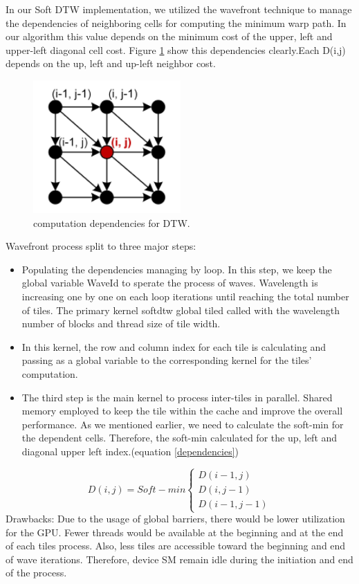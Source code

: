 \documentclass[12pt, letterpaper]{article}
\begin{document}
In our Soft DTW implementation, we utilized the wavefront technique to manage
the dependencies of neighboring cells for computing the minimum warp path. In
our algorithm this value depends on the minimum cost of the upper, left and
upper-left diagonal cell cost. Figure \ref{DTW_dependency} show this
dependencies clearly.Each D(i,j) depends on the up, left and up-left neighbor
cost.

\begin{figure}[htbp]
\includegraphics[height=2in]{img/tiling_dependencies.png}
\centering
\caption{computation dependencies for DTW.}
\label{DTW_dependency}
\end{figure}

Wavefront process split to three major steps:

\begin{itemize}
  \item Populating the dependencies managing by loop. In this step, we keep the
    global variable WaveId to sperate the process of waves. Wavelength is
    increasing one by one on each loop iterations until reaching the total
    number of tiles. The primary kernel softdtw global tiled called with the
    wavelength number of blocks and thread size of tile width.
  \item In this kernel, the row and column index for each tile is calculating
    and passing as a global variable to the corresponding kernel for the tiles’
    computation.
  \item The third step is the main kernel to process inter-tiles in
    parallel. Shared memory employed to keep the tile within the cache and
    improve the overall performance. As we mentioned earlier, we need to
    calculate the soft-min for the dependent cells. Therefore, the soft-min
    calculated for the up, left and diagonal upper left index.(equation
    \ref{dependencies})
\end{itemize}

\begin{equation} \label{dependencies}
  D (i,j) = Soft-min
  \begin{cases}
        D(i-1,j) \\
        D(i,j-1)\\
        D(i-1,j-1)
  \end{cases}
\end{equation}
Drawbacks: Due to the usage of global barriers, there would be lower utilization
for the GPU.  Fewer threads would be available at the beginning and at the end
of each tiles process.  Also, less tiles are accessible toward the beginning and
end of wave iterations.  Therefore, device SM remain idle during the initiation
and end of the process.
\end{document}
